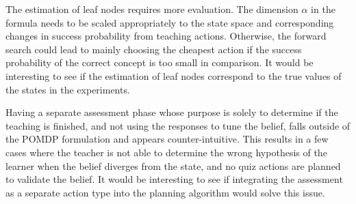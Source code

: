 The estimation of leaf nodes requires more evaluation. 
The dimension $\alpha$ in the formula needs to be scaled appropriately to the state space and corresponding changes in success probability from teaching actions. 
Otherwise, the forward search could lead to mainly choosing the cheapest action if the success probability of the correct concept is too small in comparison.
It would be interesting to see if the estimation of leaf nodes correspond to the true values of the states in the experiments.



Having a separate assessment phase whose purpose is solely to determine if the teaching is finished, and not using the responses to tune the belief, falls outside of the POMDP formulation and appears counter-intuitive. 
This results in a few cases where the teacher is not able to determine the wrong hypothesis of the learner when the belief diverges from the state, and no quiz actions are planned to validate the belief. 
It would be interesting to see if integrating the assessment as a separate action type into the planning algorithm would solve this issue.



